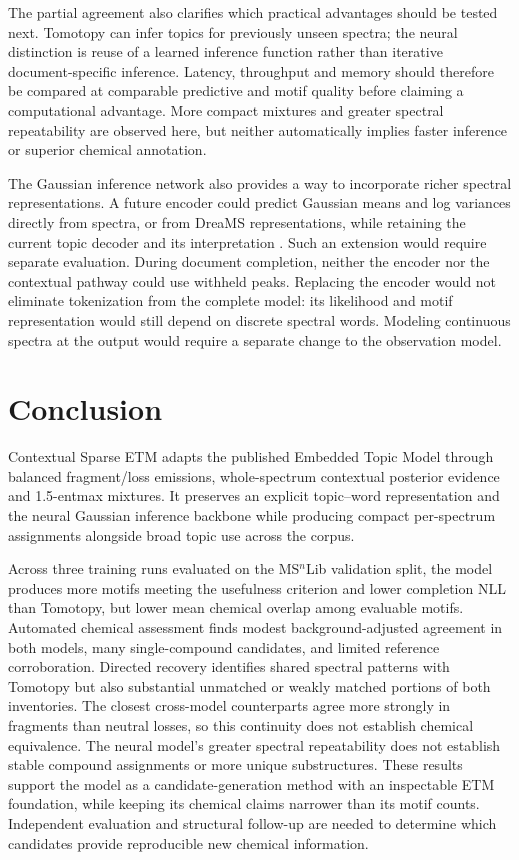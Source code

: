 \documentclass[10pt,a4paper]{article}
\begin{document}
The partial agreement also clarifies which practical advantages should be
tested next. Tomotopy can infer topics for previously unseen spectra; the
neural distinction is reuse of a learned inference function rather than
iterative document-specific inference. Latency, throughput and memory should
therefore be compared at comparable predictive and motif quality before
claiming a computational advantage. More compact mixtures and greater
spectral repeatability are observed here, but neither automatically implies
faster inference or superior chemical annotation.

The Gaussian inference network also provides a way to incorporate richer
spectral representations. A future encoder could predict Gaussian means and
log variances directly from spectra, or from DreaMS representations, while
retaining the current topic decoder and its interpretation \cite{bushuiev2026}.
Such an extension would require separate evaluation. During document completion,
neither the encoder nor the contextual pathway could use withheld peaks.
Replacing the encoder would not eliminate tokenization from the complete
model: its likelihood and motif representation would still depend on discrete
spectral words. Modeling continuous spectra at the output would require a
separate change to the observation model.

\section{Conclusion}
\label{sec:conclusion}

Contextual Sparse ETM adapts the published Embedded Topic Model through
balanced fragment/loss emissions, whole-spectrum contextual posterior evidence
and 1.5-entmax mixtures. It preserves an explicit topic--word representation
and the neural Gaussian inference backbone while producing compact
per-spectrum assignments alongside broad topic use across the corpus.

Across three training runs evaluated on the MS$^{n}$Lib validation split, the model produces more
motifs meeting the usefulness criterion and lower completion NLL than Tomotopy,
but lower mean chemical overlap among evaluable motifs. Automated chemical
assessment finds modest background-adjusted agreement in both models,
many single-compound candidates, and limited reference corroboration.
Directed recovery identifies shared spectral patterns with Tomotopy but
also substantial unmatched or weakly matched portions of both inventories.
The closest cross-model counterparts agree more strongly in fragments than
neutral losses, so this continuity does not establish chemical equivalence.
The neural model's greater spectral repeatability does not establish stable
compound assignments or more unique substructures. These results support
the model as a candidate-generation method with an inspectable ETM foundation,
while keeping its chemical claims narrower than its motif counts.
Independent evaluation and structural follow-up are needed to determine
which candidates provide reproducible new chemical information.
\end{document}
